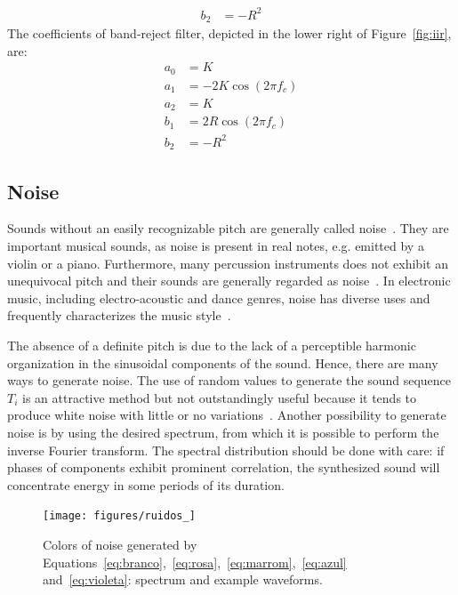 \begin{enumerate}
\begin{equation}
\begin{split}
 b_2 & =  -R^2
 \end{split}
\end{equation}
The coefficients of band-reject filter, depicted in the lower right of Figure~\ref{fig:iir}, are:
\begin{equation}\label{eq:rejeita-banda}
 \begin{split}
 a_0 & =  K \\
 a_1 & =  -2K\cos (2\pi f_c) \\
 a_2 & =  K \\
 b_1 & =  2R \cos (2\pi f_c) \\
 b_2 & =  -R^2
\end{split}
\end{equation}
\end{enumerate}

\subsection{Noise}\label{subsec:ruidos}
Sounds without an easily recognizable pitch are generally called noise~\cite{Lacerda}. They are important musical sounds, as noise is present in real notes, e.g. emitted by a violin or a piano. Furthermore, many percussion instruments does not exhibit an unequivocal pitch and their sounds are generally regarded as noise~\cite{Roederer}. In electronic music, including electro-acoustic and dance genres, noise has diverse uses and frequently characterizes the music style~\cite{Cook}. 

The absence of a definite pitch is due to the lack of a perceptible harmonic organization in the sinusoidal components of the sound.
Hence, there are many ways to generate noise. The use of random values to generate the sound sequence $T_i$ is an attractive method but not outstandingly useful because it tends to produce white noise with little or no variations~\cite{Cook}. Another possibility to generate noise is by using the desired spectrum, from which it is possible to perform the inverse Fourier transform. The spectral distribution should be done with care: if phases of components exhibit prominent correlation, the synthesized sound will concentrate energy in some periods of its duration.

\begin{figure}
	\hspace*{-.75cm}
         \texttt{[image: figures/ruidos\_]}
     \caption{Colors of noise generated by Equations~\ref{eq:branco},~\ref{eq:rosa},~\ref{eq:marrom},~\ref{eq:azul} and~\ref{eq:violeta}: spectrum and example waveforms.}
         \label{fig:ruidos}
\end{figure}

